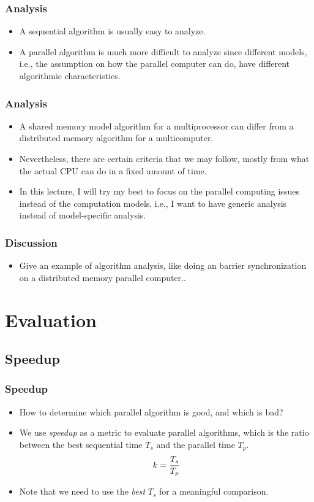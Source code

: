 \documentclass{beamer}
\begin{document}
\begin{CJK}{UTF8}{bsmi}
\begin{frame}
\frametitle{Analysis}
\begin{itemize}
\item A sequential algorithm is usually easy to analyze.
\item A parallel algorithm is much more difficult to analyze since
  different models, i.e., the assumption on how the parallel computer
  can do, have different algorithmic characteristics.
\end{itemize}
\end{frame}

\begin{frame}
\frametitle{Analysis}
\begin{itemize}
\item A shared memory model algorithm for a multiprocessor can differ from a distributed memory algorithm for a multicomputer.
\item Nevertheless, there are certain criteria that we may follow, mostly from what the actual CPU can do in a fixed amount of time.
\item In this lecture, I will try my best to focus on the parallel computing issues instead of the computation models, i.e., I want to have generic analysis instead of model-specific analysis.
\end{itemize}
\end{frame}

\begin{frame}
\frametitle{Discussion}
\begin{itemize}
\item Give an example of algorithm analysis, like doing an barrier
  synchronization on a distributed memory parallel computer..
\end{itemize}
\end{frame}

\section{Evaluation}

\subsection{Speedup}

\begin{frame}
\frametitle{Speedup}
\begin{itemize}
\item How to determine which parallel algorithm is good, and which is
  bad?
\item We use {\em speedup} as a metric to evaluate parallel
  algorithms, which is the ratio between the best sequential time $T_s$
  and the parallel time $T_p$.
\begin{equation} 
k = {{T_s}\over{T_p}}
\end{equation}
\item Note that we need to use the {\em best} $T_s$ for a meaningful
  comparison.
\end{itemize}
\end{frame}


\end{CJK}
\end{document}
